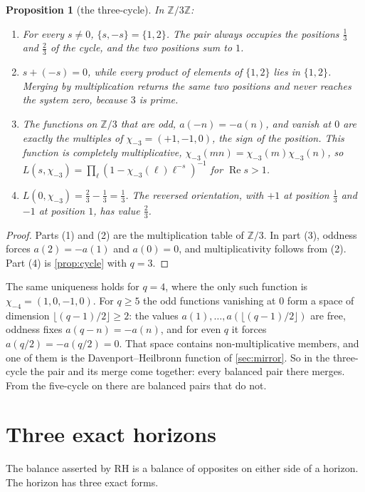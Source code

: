 \documentclass[11pt]{article}
\newtheorem{proposition}[theorem]{Proposition}
\theoremstyle{definition}\newtheorem{definition}[theorem]{Definition}
\theoremstyle{remark}\newtheorem{remark}[theorem]{Remark}
\renewcommand{\Re}{\operatorname{Re}}\renewcommand{\Im}{\operatorname{Im}}
\begin{document}
\begin{proposition}[the three-cycle]\label{prop:three}
In $\mathbb Z/3\mathbb Z$:
\begin{enumerate}
\item For every $s\neq0$, $\{s,-s\}=\{1,2\}$. The pair always occupies the positions $\tfrac13$ and $\tfrac23$ of the cycle, and the two positions sum to $1$.
\item $s+(-s)=0$, while every product of elements of $\{1,2\}$ lies in $\{1,2\}$. Merging by multiplication returns the same two positions and never reaches the system zero, because $3$ is prime.
\item The functions on $\mathbb Z/3$ that are odd, $a(-n)=-a(n)$, and vanish at $0$ are exactly the multiples of $\chi_{-3}=(+1,-1,0)$, the sign of the position. This function is completely multiplicative, $\chi_{-3}(mn)=\chi_{-3}(m)\chi_{-3}(n)$, so $L(s,\chi_{-3})=\prod_\ell(1-\chi_{-3}(\ell)\ell^{-s})^{-1}$ for $\Re s>1$.
\item $L(0,\chi_{-3})=\tfrac23-\tfrac13=\tfrac13$. The reversed orientation, with $+1$ at position $\tfrac13$ and $-1$ at position $1$, has value $\tfrac23$.
\end{enumerate}
\end{proposition}
\begin{proof}
Parts (1) and (2) are the multiplication table of $\mathbb Z/3$. In part (3), oddness forces $a(2)=-a(1)$ and $a(0)=0$, and multiplicativity follows from (2). Part (4) is \cref{prop:cycle} with $q=3$.
\end{proof}

The same uniqueness holds for $q=4$, where the only such function is $\chi_{-4}=(1,0,-1,0)$. For $q\ge5$ the odd functions vanishing at $0$ form a space of dimension $\lfloor (q-1)/2\rfloor\ge2$: the values $a(1),\dots,a(\lfloor (q-1)/2\rfloor)$ are free, oddness fixes $a(q-n)=-a(n)$, and for even $q$ it forces $a(q/2)=-a(q/2)=0$. That space contains non-multiplicative members, and one of them is the Davenport--Heilbronn function of \cref{sec:mirror}. So in the three-cycle the pair and its merge come together: every balanced pair there merges. From the five-cycle on there are balanced pairs that do not.

\section{Three exact horizons}\label{sec:horizon}
The balance asserted by RH is a balance of opposites on either side of a horizon. The horizon has three exact forms.
\end{document}
